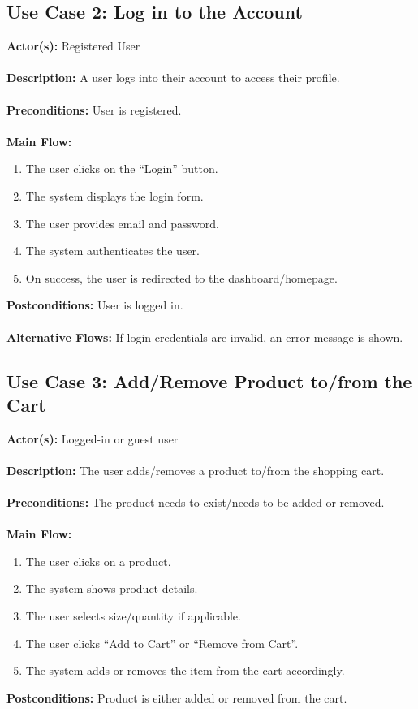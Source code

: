 \documentclass[a4paper,12pt]{article}
\begin{document}
    \subsection*{Use Case 2: Log in to the Account}
	\textbf{Actor(s):} Registered User \\ \\
	\textbf{Description:} A user logs into their account to access their profile. \\ \\
	\textbf{Preconditions:} User is registered. \\ \\
	\textbf{Main Flow:}
	\begin{enumerate}
  		\item The user clicks on the ``Login'' button.
  		\item The system displays the login form.
  		\item The user provides email and password.
  		\item The system authenticates the user.
  		\item On success, the user is redirected to the dashboard/homepage.
	\end{enumerate}
	\textbf{Postconditions:} User is logged in. \\ \\
	\textbf{Alternative Flows:} If login credentials are invalid, an error message is shown.

	\subsection*{Use Case 3: Add/Remove Product to/from the Cart}
	\textbf{Actor(s):} Logged-in or guest user \\ \\
	\textbf{Description:} The user adds/removes a product to/from the shopping cart. \\ \\
	\textbf{Preconditions:} The product needs to exist/needs to be added or removed. \\ \\
	\textbf{Main Flow:}
	\begin{enumerate}
  		\item The user clicks on a product.
  		\item The system shows product details.
  		\item The user selects size/quantity if applicable.
  		\item The user clicks ``Add to Cart'' or ``Remove from Cart''.
  		\item The system adds or removes the item from the cart accordingly.
	\end{enumerate}
	\textbf{Postconditions:} Product is either added or removed from the cart.
\end{document}

